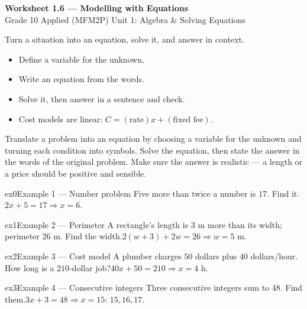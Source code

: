 \documentclass[11pt]{article}
\begin{document}
\begin{center}
{\LARGE\bfseries\color{titleblue}Worksheet 1.6 --- Modelling with Equations}\\[2pt]
{\small Grade 10 Applied (MFM2P) \textperiodcentered{} Unit 1: Algebra \& Solving Equations}
\end{center}

\begin{ideabox}
Turn a situation into an equation, solve it, and answer in context.
\begin{itemize}[leftmargin=*,itemsep=2pt]
  \item Define a variable for the unknown.
  \item Write an equation from the words.
  \item Solve it, then answer in a sentence and check.
  \item Cost models are linear: $C=(\text{rate})x+(\text{fixed fee})$.
\end{itemize}
\end{ideabox}

\begin{learnbox}
Translate a problem into an equation by choosing a variable for the unknown and turning each condition into symbols.
Solve the equation, then state the answer in the words of the original problem.
Make sure the answer is realistic — a length or a price should be positive and sensible.
\end{learnbox}


\begin{example}{ex0}{Example 1 --- Number problem}
Five more than twice a number is $17$. Find it.\soln $2x+5=17\Rightarrow x=6$.
\end{example}

\begin{example}{ex1}{Example 2 --- Perimeter}
A rectangle's length is $3$ m more than its width; perimeter $26$ m. Find the width.\soln $2(w+3)+2w=26\Rightarrow w=5$ m.
\end{example}

\begin{example}{ex2}{Example 3 --- Cost model}
A plumber charges $50$ dollars plus $40$ dollars/hour. How long is a $210$-dollar job?\soln $40x+50=210\Rightarrow x=4$ h.
\end{example}

\begin{example}{ex3}{Example 4 --- Consecutive integers}
Three consecutive integers sum to $48$. Find them.\soln $3x+3=48\Rightarrow x=15$: $15,16,17$.
\end{example}
\end{document}
